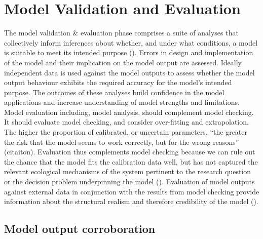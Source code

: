 \documentclass[
]{article}
\begin{document}
\section{Model Validation and
Evaluation}\label{model-validation-and-evaluation}

\begin{tcolorbox}[enhanced jigsaw, toprule=.15mm, titlerule=0mm, coltitle=black, title=\textcolor{quarto-callout-note-color}{\faInfo}\hspace{0.5em}{Explanation}, bottomtitle=1mm, arc=.35mm, breakable, toptitle=1mm, bottomrule=.15mm, left=2mm, colframe=quarto-callout-note-color-frame, colback=white, rightrule=.15mm, leftrule=.75mm, colbacktitle=quarto-callout-note-color!10!white, opacityback=0, opacitybacktitle=0.6]

The model validation \& evaluation phase comprises a suite of analyses
that collectively inform inferences about whether, and under what
conditions, a model is suitable to meet its intended purpose
(). Errors in
design and implementation of the model and their implication on the
model output are assessed. Ideally independent data is used against the
model outputs to assess whether the model output behaviour exhibits the
required accuracy for the model's intended purpose. The outcomes of
these analyses build confidence in the model applications and increase
understanding of model strengths and limitations. Model evaluation
including, model analysis, should complement model checking. It should
evaluate model checking, and consider over-fitting and extrapolation.
The higher the proportion of calibrated, or uncertain parameters, ``the
greater the risk that the model seems to work correctly, but for the
wrong reasons'' (citaiton). Evaluation thus complements model checking
because we can rule out the chance that the model fits the calibration
data well, but has not captured the relevant ecological mechanisms of
the system pertinent to the research question or the decision problem
underpinning the model (). Evaluation of model outputs against external data in conjunction
with the results from model checking provide information about the
structural realism and therefore credibility of the model
().

\end{tcolorbox}

\subsection{Model output
corroboration}\label{model-output-corroboration}
\end{document}
